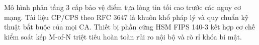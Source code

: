 \begin{kbox}
Mô hình phân tầng 3 cấp bảo vệ điểm tựa lòng tin tối cao trước các nguy cơ mạng. Tài liệu CP/CPS theo RFC 3647 là khuôn khổ pháp lý và quy chuẩn kỹ thuật bắt buộc của mọi CA. Thiết bị phần cứng HSM FIPS 140-3 kết hợp cơ chế kiểm soát kép M-of-N triệt tiêu hoàn toàn rủi ro nội bộ và rò rỉ khóa bí mật.
\end{kbox}
